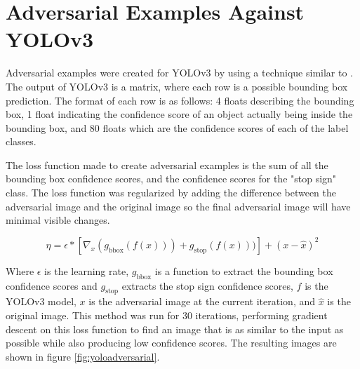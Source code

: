 \documentclass{article}
\begin{document}
\section{Adversarial Examples Against YOLOv3}

Adversarial examples were created for YOLOv3 \cite{redmon2018yolov3} by using a technique similar to \cite{goodfellow2015explaining}. The output of YOLOv3 is a matrix, where each row is a possible bounding box prediction. The format of each row is as follows: 4 floats describing the bounding box, 1 float indicating the confidence score of an object actually being inside the bounding box, and 80 floats which are the confidence scores of each of the label classes.

The loss function made to create adversarial examples is the sum of all the bounding box confidence scores, and the confidence scores for the "stop sign" class. The loss function was regularized by adding the difference between the adversarial image and the original image so the final adversarial image will have minimal visible changes.

\begin{equation}
    \eta = \epsilon * [\nabla_{x} (g_{\text{bbox}}(f(x))) + g_{\text{stop}}(f(x)))] + (x - \hat{x})^2
\end{equation}

Where $\epsilon$ is the learning rate, $g_{\text{bbox}}$ is a function to extract the bounding box confidence scores and $g_{\text{stop}}$ extracts the stop sign confidence scores, $f$ is the YOLOv3 model, $x$ is the adversarial image at the current iteration, and $\hat{x}$ is the original image. This method was run for 30 iterations, performing gradient descent on this loss function to find an image that is as similar to the input as possible while also producing low confidence scores. The resulting images are shown in figure \ref{fig:yoloadversarial}.
\end{document}
